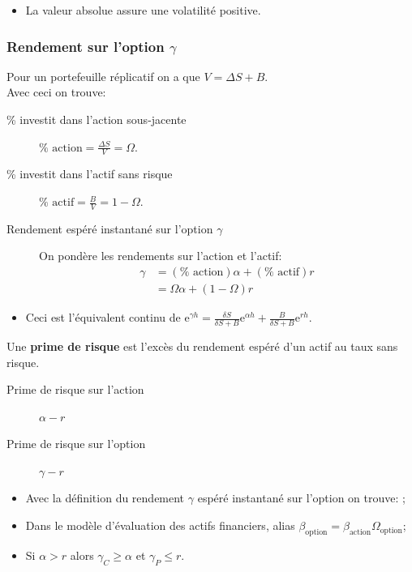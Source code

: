 \documentclass[10pt, french]{article}
\begin{document}
\begin{multicols*}{2}
\begin{itemize}
	\item	La valeur absolue assure une volatilité positive.
\end{itemize}

\subsubsection*{Rendement sur l'option $\gamma$}
Pour un portefeuille réplicatif on a que $V = \Delta S + B$. \\
Avec ceci on trouve:
\begin{description}
	\item[\% investit dans l'action sous-jacente]	$\% \text{ action} = \frac{\Delta S}{V} = \Omega$.
	\item[\% investit dans l'actif sans risque]	$\% \text{ actif} = \frac{B}{V} = 1 - \Omega$.
	\item[Rendement espéré instantané sur l'option $\gamma$]	On pondère les rendements sur l'action et l'actif:
		\begin{align*}
		\gamma 
		&=	(\% \text{ action}) \alpha + (\% \text{ actif}) r	\\
		&=	\Omega \alpha + (1 - \Omega) r
		\end{align*}
\end{description}
\begin{itemize}[leftmargin = *]
	\item	Ceci est l'équivalent continu de $\textrm{e}^{\gamma h} = \frac{\delta S}{\delta S + B}\textrm{e}^{\alpha h} + \frac{B}{\delta S + B}\textrm{e}^{r h}$.
\end{itemize}

\begin{definitionNOHFILLsub}
Une \textbf{prime de risque} est l'excès du rendement espéré d'un actif au taux sans risque.
\begin{description}
	\item[Prime de risque sur l'action]	$\alpha - r$
	\item[Prime de risque sur l'option]	$\gamma - r$
\end{description}
\begin{itemize}[leftmargin = *]
	\item	Avec la définition du rendement $\gamma$ espéré instantané sur l'option on trouve: ;
	\item	Dans le modèle d'évaluation des actifs financiers,  alias $\beta_{\text{option}}	=	\beta_{\text{action}} \Omega_{\text{option}}$;
	\item	Si $\alpha > r$ alors $\gamma_{C} \geq \alpha$ et $\gamma_{P} \leq r$.
\end{itemize}
\end{definitionNOHFILLsub}


\end{multicols*}
\end{document}
